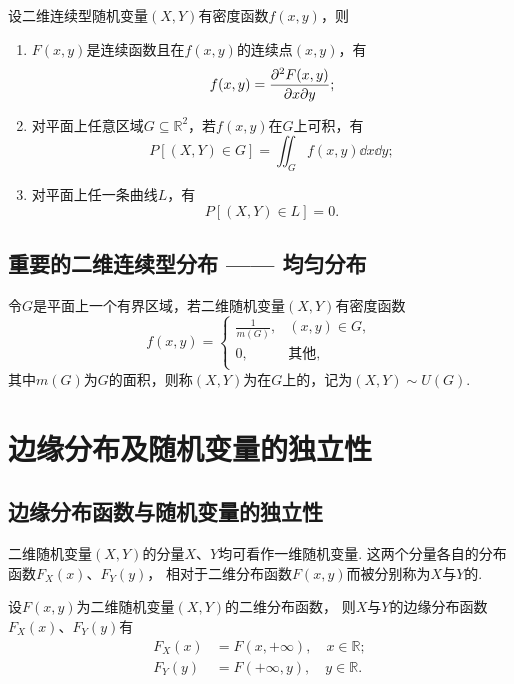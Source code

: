 \begin{theorem}
设二维连续型随机变量\((X,Y)\)有密度函数\(f(x,y)\)，则
\begin{enumerate}
	\item \(F(x,y)\)是连续函数且在\(f(x,y)\)的连续点\((x,y)\)，有\[
		f(x,y) = \pdv{F(x,y)}{x}{y};
	\]

	\item 对平面上任意区域\(G \subseteq \mathbb{R}^2\)，若\(f(x,y)\)在\(G\)上可积，有\[
		P\left[(X,Y) \in G\right] = \iint_G{f(x,y) \dd{x}\dd{y}};
	\]

	\item 对平面上任一条曲线\(L\)，有\[
		P\left[(X,Y) \in L\right] = 0.
	\]
\end{enumerate}
\end{theorem}

\subsection{重要的二维连续型分布 —— 均匀分布}
\begin{definition}
令\(G\)是平面上一个有界区域，若二维随机变量\((X,Y)\)有密度函数\[
f(x,y) = \left\{ \begin{array}{ll}
\frac{1}{m(G)}, & (x,y) \in G, \\
0, & \text{其他}, \\
\end{array} \right.
\]其中\(m(G)\)为\(G\)的面积，则称\((X,Y)\)为在\(G\)上的，记为\((X,Y) \sim U(G)\).
\end{definition}

\section{边缘分布及随机变量的独立性}
\subsection{边缘分布函数与随机变量的独立性}
\begin{definition}
二维随机变量\((X,Y)\)的分量\(X\)、\(Y\)均可看作一维随机变量.
这两个分量各自的分布函数\(F_X(x)\)、\(F_Y(y)\)，
相对于二维分布函数\(F(x,y)\)而被分别称为\(X\)与\(Y\)的.
\end{definition}

\begin{theorem}
设\(F(x,y)\)为二维随机变量\((X,Y)\)的二维分布函数，
则\(X\)与\(Y\)的边缘分布函数\(F_X(x)\)、\(F_Y(y)\)有
\begin{align*}
F_X(x) &= F(x,+\infty), \quad x \in \mathbb{R}; \\
F_Y(y) &= F(+\infty,y), \quad y \in \mathbb{R}.
\end{align*}
\end{theorem}

